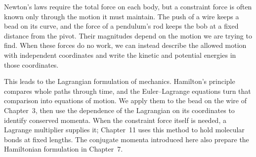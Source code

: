Newton's laws require the total force on each body, but a constraint
force is often known only through the motion it must maintain. The push
of a wire keeps a bead on its curve, and the force of a pendulum's rod
keeps the bob at a fixed distance from the pivot. Their magnitudes depend
on the motion we are trying to find. When these forces do no work, we can
instead describe the allowed motion with independent coordinates and
write the kinetic and potential energies in those coordinates.

This leads to the Lagrangian formulation of mechanics. Hamilton's
principle compares whole paths through time, and the Euler--Lagrange
equations turn that comparison into equations of motion. We apply them
to the bead on the wire of Chapter~3, then use the dependence of the
Lagrangian on its coordinates to identify conserved momenta. When the
constraint force itself is needed, a Lagrange multiplier supplies it;
Chapter~11 uses this method to hold molecular bonds at fixed lengths.
The conjugate momenta introduced here also prepare the Hamiltonian
formulation in Chapter~7.

